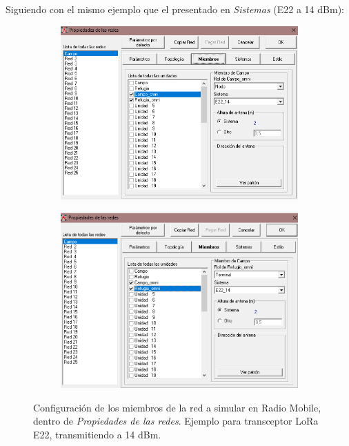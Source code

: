 \documentclass[12pt]{article}
\begin{document}
\begin{itemize}
		
		Siguiendo con el mismo ejemplo que el presentado en \textit{Sistemas} (E22 a 14 dBm): \\
		
		\begin{figure}[h!]
			\begin{subfigure}{0.5\textwidth}
				\includegraphics[width=1\textwidth]{img/propRedes_miembrosE2214_radioMobile.png} 
				\caption{}
				\label{fig: prop redes miembro nodo radio mobile}
			\end{subfigure}
			\begin{subfigure}{0.5\textwidth}
				\includegraphics[width=1\linewidth]{img/propRedes_miembroTerminalE2214_radioMobile.png}
				\caption{}
				\label{fig: prop redes miembro terminal radio mobile}
			\end{subfigure}
			\caption{Configuración de los miembros de la red a simular en Radio Mobile, dentro de \textit{Propiedades de las redes}. Ejemplo para transceptor LoRa E22, transmitiendo a 14 dBm.}
			\label{fig: prop redes miembros radio mobile}
		\end{figure}
		

\end{itemize}
\end{document}
